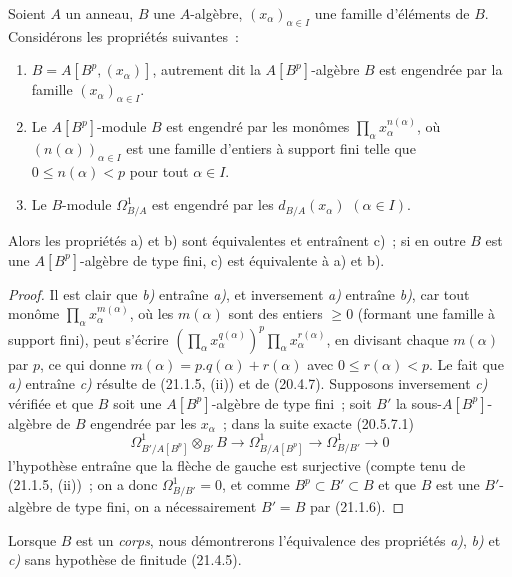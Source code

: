 \begin{proposition}[21.1.7]
\label{0.21.1.7-fr}
Soient $A$ un anneau, $B$ une $A$-algèbre, $(x_\alpha)_{\alpha\in I}$ une
famille d'éléments de $B$. Considérons les propriétés suivantes~:
\begin{enumerate}
  \item[\textup{a)}] $B=A[B^p,(x_\alpha)]$, autrement dit la $A[B^p]$-algèbre
  $B$ est engendrée par la famille $(x_\alpha)_{\alpha\in I}$.
  \item[\textup{b)}] Le $A[B^p]$-module $B$ est engendré par les monômes
  $\prod_\alpha x_\alpha^{n(\alpha)}$, où $(n(\alpha))_{\alpha\in I}$ est
  une famille d'entiers à support fini telle que $0\leq n(\alpha)<p$ pour
  tout $\alpha\in I$.
  \item[\textup{c)}] Le $B$-module $\Omega^1_{B/A}$ est engendré par les
  $d_{B/A}(x_\alpha)$ $(\alpha\in I)$.
\end{enumerate}

Alors les propriétés \textup{a)} et \textup{b)} sont équivalentes et entraînent \textup{c)}~; si en
outre $B$ est une $A[B^p]$-algèbre de type fini, \textup{c)} est équivalente à \textup{a)} et \textup{b)}.
\end{proposition}

\begin{proof}
Il est clair que \emph{b)} entraîne \emph{a)}, et inversement \emph{a)} entraîne \emph{b)}, car tout
monôme $\prod_\alpha x_\alpha^{m(\alpha)}$, où les $m(\alpha)$ sont des
entiers $\geq0$ (formant une famille à support fini), peut s'écrire
$(\prod_\alpha x_\alpha^{q(\alpha)})^p\prod_\alpha x_\alpha^{r(\alpha)}$,
en divisant chaque $m(\alpha)$ par $p$, ce qui donne
$m(\alpha)=p.q(\alpha)+r(\alpha)$ avec $0\leq r(\alpha)<p$.
Le fait que \emph{a)} entraîne \emph{c)} résulte de (21.1.5, (ii)) et de (20.4.7).
Supposons inversement \emph{c)} vérifiée et que $B$ soit une $A[B^p]$-algèbre de
type fini~; soit $B'$ la sous-$A[B^p]$-algèbre de $B$ engendrée par les
$x_\alpha$~; dans la suite exacte (20.5.7.1)
\[
\Omega^1_{B'/A[B^p]}\otimes_{B'}B\longrightarrow
\Omega^1_{B/A[B^p]}\longrightarrow\Omega^1_{B/B'}\longrightarrow0
\]
l'hypothèse entraîne que la flèche de gauche est surjective (compte tenu de
(21.1.5, (ii))~; on a donc $\Omega^1_{B/B'}=0$, et comme
$B^p\subset B'\subset B$ et que $B$ est une $B'$-algèbre de type fini,
on a nécessairement $B'=B$ par (21.1.6).
\end{proof}

\begin{remark}[21.1.8]
\label{0.21.1.8-fr}
Lorsque $B$ est un \emph{corps}, nous démontrerons l'équivalence des propriétés \emph{a)},
\emph{b)} et \emph{c)} sans hypothèse de finitude (21.4.5).
\end{remark}

